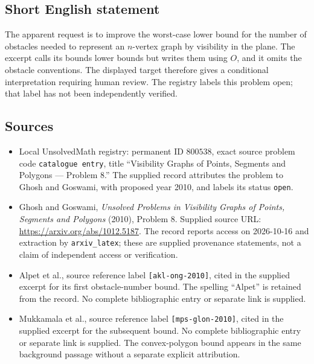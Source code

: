 \documentclass[11pt]{article}
\begin{document}
\subsection{Short English statement}
The apparent request is to improve the worst-case lower bound for the number of obstacles needed to represent an \(n\)-vertex graph by visibility in the plane. The excerpt calls its bounds lower bounds but writes them using \(O\), and it omits the obstacle conventions. The displayed target therefore gives a conditional interpretation requiring human review. The registry labels this problem open; that label has not been independently verified.
\subsection{Sources}
\begin{itemize}
\item Local UnsolvedMath registry: permanent ID \(800538\), exact source problem code \texttt{catalogue entry}, title ``Visibility Graphs of Points, Segments and Polygons --- Problem 8.'' The supplied record attributes the problem to Ghosh and Goswami, with proposed year 2010, and labels its status \texttt{open}.
\item Ghosh and Goswami, \emph{Unsolved Problems in Visibility Graphs of Points, Segments and Polygons} (2010), Problem 8. Supplied source URL: \url{https://arxiv.org/abs/1012.5187}. The record reports access on 2026-10-16 and extraction by \texttt{arxiv\_latex}; these are supplied provenance statements, not a claim of independent access or verification.
\item Alpet et al., source reference label \texttt{[akl-ong-2010]}, cited in the supplied excerpt for its first obstacle-number bound. The spelling ``Alpet'' is retained from the record. No complete bibliographic entry or separate link is supplied.
\item Mukkamala et al., source reference label \texttt{[mps-glon-2010]}, cited in the supplied excerpt for the subsequent bound. No complete bibliographic entry or separate link is supplied. The convex-polygon bound appears in the same background passage without a separate explicit attribution.
\end{itemize}
\end{document}
